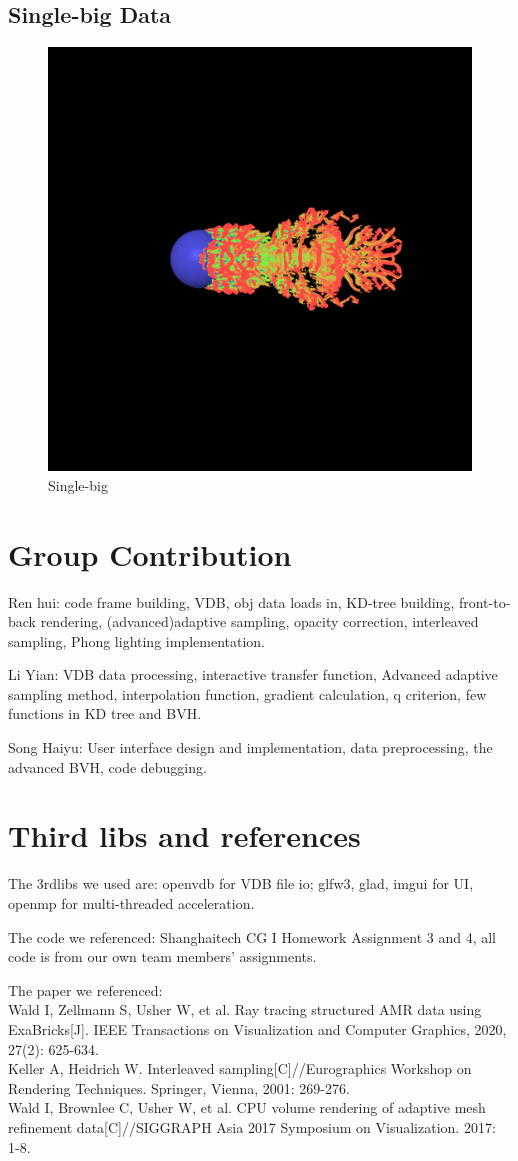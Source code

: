 \documentclass[acmtog]{acmart}
\begin{document}
\subsection{Single-big Data}


\begin{figure}[H]
	\centering
	\includegraphics[width = 0.68\linewidth]{images/single_big.png}
	\caption{Single-big}
\end{figure}


\section{Group Contribution}


Ren hui: code frame building, VDB, obj data loads in, KD-tree building, front-to-back rendering, (advanced)adaptive sampling, opacity correction, interleaved sampling, Phong lighting implementation.


Li Yian: VDB data processing, interactive transfer function, Advanced adaptive sampling method, interpolation function, gradient calculation, q criterion, few functions in KD tree and BVH.


Song Haiyu: User interface design and implementation, data preprocessing, the advanced BVH, code debugging.


\section{Third libs and references}


The 3rdlibs we used are: openvdb for VDB file io; glfw3, glad, imgui for UI, openmp for multi-threaded acceleration.


The code we referenced: Shanghaitech CG I Homework Assignment 3 and 4, all code is from our own team members' assignments.


The paper we referenced: \\
Wald I, Zellmann S, Usher W, et al. Ray tracing structured AMR data using ExaBricks[J]. IEEE Transactions on Visualization and Computer Graphics, 2020, 27(2): 625-634.\\
Keller A, Heidrich W. Interleaved sampling[C]//Eurographics Workshop on Rendering Techniques. Springer, Vienna, 2001: 269-276.\\
Wald I, Brownlee C, Usher W, et al. CPU volume rendering of adaptive mesh refinement data[C]//SIGGRAPH Asia 2017 Symposium on Visualization. 2017: 1-8.
\end{document}

